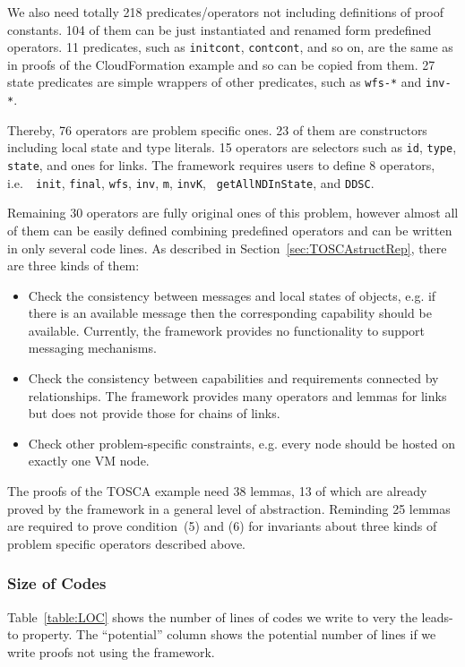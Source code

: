 \documentclass[12pt]{report}
\begin{document}
We also need totally 218 predicates/operators not including
definitions of proof constants. 104 of them can be
just instantiated and renamed form predefined operators. 11
predicates, such as {\tt initcont}, {\tt contcont}, and so on, are the
same as in proofs of the CloudFormation example and so can be copied
from them.  27 state predicates are simple wrappers of other
predicates, such as {\tt wfs-*} and {\tt inv-*}.

Thereby, 76 operators are problem specific ones. 23 of them are
constructors including local state and type literals. 15 operators are
selectors such as {\tt id}, {\tt type}, {\tt state}, and ones for
links. The framework requires users to define 8 operators, i.e.\ {\tt
  init}, {\tt final}, {\tt wfs}, {\tt inv}, {\tt m}, {\tt invK}, {\tt
  getAllNDInState}, and {\tt DDSC}.

Remaining 30 operators are fully original ones of this problem,
however almost all of them can be easily defined combining predefined
operators and can be written in only several code lines. As described in
Section~\ref{sec:TOSCAstructRep}, there are three kinds of them:
\begin{itemize}
\item Check the consistency between messages and local states of
  objects, e.g. if there is an available message then the
  corresponding capability should be available. Currently, the
  framework provides no functionality to support messaging mechanisms.
\item Check the consistency between capabilities and requirements
  connected by relationships. The framework provides many operators
  and lemmas for links but does not provide those for chains of links.
\item Check other problem-specific constraints, e.g.  every node
  should be hosted on exactly one VM node.
\end{itemize}

The proofs of the TOSCA example need 38
lemmas, 13 of which are already proved by the framework in a general
level of abstraction. Reminding 25 lemmas are required to prove
condition~(5) and (6) for invariants about
three kinds of problem specific operators described above.

\subsubsection{Size of Codes}
Table~\ref{table:LOC} shows the number of lines of codes we write to
very the leads-to property. The ``potential'' column shows the
potential number of lines if we write proofs not using the framework.
\end{document}
